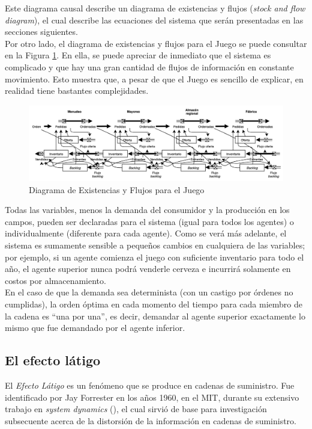 Este diagrama causal describe un diagrama de existencias y flujos (\textit{stock and flow diagram}), el cual describe las ecuaciones del sistema que ser\'an presentadas en las secciones siguientes.\\

Por otro lado, el diagrama de existencias y flujos para el Juego se puede consultar en la Figura \ref{stockflow}. En ella, se puede apreciar de inmediato que el sistema es complicado y que hay una gran cantidad de flujos de informaci\'on en constante movimiento. Esto muestra que, a pesar de que el Juego es sencillo de explicar, en realidad tiene bastantes complejidades.

\begin{figure}[ht]
\caption{Diagrama de Existencias y Flujos para el Juego}
\label{stockflow}
\includegraphics[width=14cm]{tesis_tex/figs/beer_distribution_game_stock_flow.PNG}
\centering
\end{figure}

Todas las variables, menos la demanda del consumidor y la producci\'on en los campos, pueden ser declaradas para el sistema (igual para todos los agentes) o individualmente (diferente para cada agente). Como se ver\'a m\'as adelante, el sistema es sumamente sensible a peque\~nos cambios en cualquiera de las variables; por ejemplo, si un agente comienza el juego con suficiente inventario para todo el a\~no, el agente superior nunca podr\'a venderle cerveza e incurrir\'a solamente en costos por almacenamiento.\\

En el caso de que la demanda sea determinista (con un castigo por \'ordenes no cumplidas), la orden \'optima en cada momento del tiempo para cada miembro de la cadena es ``una por una'', es decir, demandar al agente superior exactamente lo mismo que fue demandado por el agente inferior.

\subsection{El efecto látigo}

El \textit{Efecto Látigo} es un fen\'omeno que se produce en cadenas de suministro. Fue identificado por Jay Forrester en los a\~nos 1960, en el MIT, durante su extensivo trabajo en \textit{system dynamics} (\cite{bookbullwhip}), el cual sirvi\'o de base para investigaci\'on subsecuente acerca de la distorsi\'on de la informaci\'on en cadenas de suministro.\\

